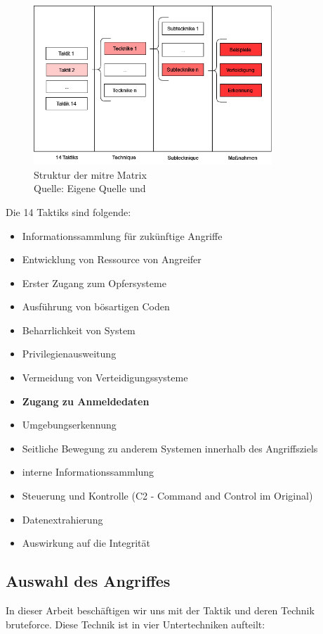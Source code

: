 \begin{figure}[H]
   \centering
   \includegraphics[width=0.8\textwidth]{assets/Mitre_structure.drawio.png}
   \caption[Struktur der \gls{mitre} Matrix]
   {Struktur der \gls{mitre} Matrix \\Quelle: Eigene Quelle und \citep{Mitre_Started}}
   \centering
\end{figure}

{
Die 14 Taktiks sind folgende:
\begin{itemize}[noitemsep]
   \item Informationssammlung für zukünftige Angriffe 
   \item	Entwicklung von Ressource von Angreifer
   \item Erster Zugang zum Opfersysteme 
   \item Ausführung von bösartigen Coden
   \item Beharrlichkeit von System
   \item	Privilegienausweitung
   \item Vermeidung von Verteidigungssysteme
   \item \textbf{Zugang zu Anmeldedaten}
   \item Umgebungserkennung
   \item Seitliche Bewegung zu anderem Systemen innerhalb des Angriffsziels
   \item interne Informationssammlung
   \item Steuerung und Kontrolle (C2 - Command and Control im Original)
   \item Datenextrahierung 
   \item	Auswirkung auf die Integrität
\end{itemize}
}

\subsection{Auswahl des Angriffes}
In dieser Arbeit beschäftigen wir uns mit der Taktik  und deren Technik \gls{bruteforce}. Diese Technik ist in vier Untertechniken aufteilt:

